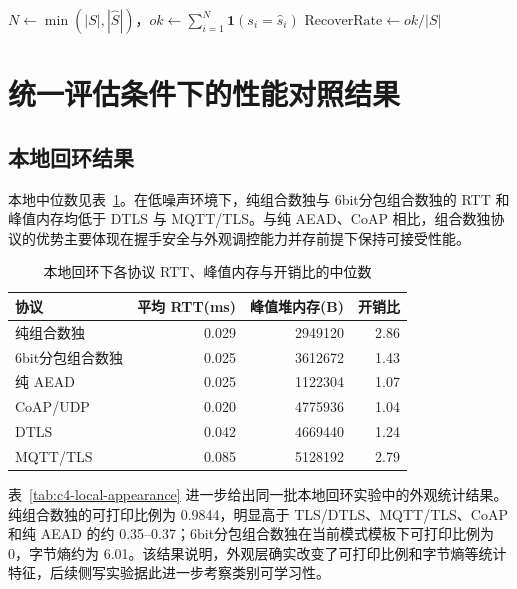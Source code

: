 \begin{algorithm}[H]
\small
\caption{主动攻击判定与 MITM 恢复率计算}
\label{alg:c4-attack-judge}
$N \leftarrow \min(|S|,|\hat{S}|)$，$ok \leftarrow \sum_{i=1}^{N}\mathbf{1}(s_i=\hat{s}_i)$\;
$\mathrm{RecoverRate} \leftarrow ok/|S|$\;
\end{algorithm}
\FloatBarrier

\section{统一评估条件下的性能对照结果}
\subsection{本地回环结果}
本地中位数见表~\ref{tab:c4-local-baseline}。在低噪声环境下，纯组合数独与 6bit分包组合数独的 RTT 和峰值内存均低于 DTLS 与 MQTT/TLS。与纯 AEAD、CoAP 相比，组合数独协议的优势主要体现在握手安全与外观调控能力并存前提下保持可接受性能。

\begin{table}[H]
\centering
\small
\caption{本地回环下各协议 RTT、峰值内存与开销比的中位数}
\label{tab:c4-local-baseline}
\begin{tabular}{lrrr}
\toprule
协议 & 平均 RTT(ms) & 峰值堆内存(B) & 开销比 \\
\midrule
纯组合数独 & 0.029 & 2949120 & 2.86 \\
6bit分包组合数独 & 0.025 & 3612672 & 1.43 \\
纯 AEAD & 0.025 & 1122304 & 1.07 \\
CoAP/UDP & 0.020 & 4775936 & 1.04 \\
DTLS & 0.042 & 4669440 & 1.24 \\
MQTT/TLS & 0.085 & 5128192 & 2.79 \\
\bottomrule
\end{tabular}
\end{table}

表~\ref{tab:c4-local-appearance} 进一步给出同一批本地回环实验中的外观统计结果。纯组合数独的可打印比例为 0.9844，明显高于 TLS/DTLS、MQTT/TLS、CoAP 和纯 AEAD 的约 0.35--0.37；6bit分包组合数独在当前模式模板下可打印比例为 0，字节熵约为 6.01。该结果说明，外观层确实改变了可打印比例和字节熵等统计特征，后续侧写实验据此进一步考察类别可学习性。

